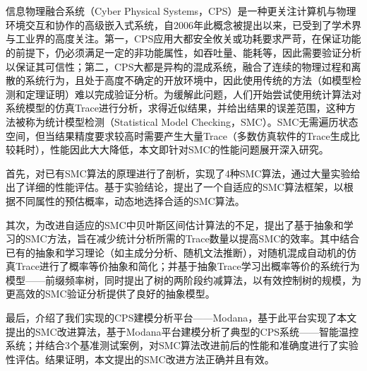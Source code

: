 \vspace{-2.5cm}
\chapter*{}

信息物理融合系统（Cyber Physical Systems，CPS）是一种更关注计算机与物理环境交互和协作的高级嵌入式系统，自2006年此概念被提出以来，已受到了学术界与工业界的高度关注。第一，CPS应用大都安全攸关或功耗要求严苛，在保证功能的前提下，仍必须满足一定的非功能属性，如吞吐量、能耗等，因此需要验证分析以保证其可信性；第二，CPS大都是异构的混成系统，融合了连续的物理过程和离散的系统行为，且处于高度不确定的开放环境中，因此使用传统的方法（如模型检测和定理证明）难以完成验证分析。为缓解此问题，人们开始尝试使用统计算法对系统模型的仿真Trace进行分析，求得近似结果，并给出结果的误差范围，这种方法被称为统计模型检测（Statistical Model Checking，SMC）。SMC无需遍历状态空间，但当结果精度要求较高时需要产生大量Trace（多数仿真软件的Trace生成比较耗时），性能因此大大降低，本文即针对SMC的性能问题展开深入研究。

首先，对已有SMC算法的原理进行了剖析，实现了4种SMC算法，通过大量实验给出了详细的性能评估。基于实验结论，提出了一个自适应的SMC算法框架，以根据不同属性的预估概率，动态地选择合适的SMC算法。

其次，为改进自适应的SMC中贝叶斯区间估计算法的不足，提出了基于抽象和学习的SMC方法，旨在减少统计分析所需的Trace数量以提高SMC的效率。其中结合已有的抽象和学习理论（如主成分分析、随机文法推断），对随机混成自动机的仿真Trace进行了概率等价抽象和简化；并基于抽象Trace学习出概率等价的系统行为模型——前缀频率树，同时提出了树的两阶段约减算法，以有效控制树的规模，为更高效的SMC验证分析提供了良好的抽象模型。

最后，介绍了我们实现的CPS建模分析平台——Modana，基于此平台实现了本文提出的SMC改进算法，基于Modana平台建模分析了典型的CPS系统——智能温控系统；并结合3个基准测试案例，对SMC算法改进前后的性能和准确度进行了实验性评估。结果证明，本文提出的SMC改进方法正确并且有效。

\hspace{-0.5cm}
 
